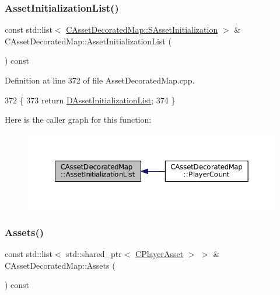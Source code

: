 \subsubsection{\texorpdfstring{Asset\+Initialization\+List()}{AssetInitializationList()}}
{\footnotesize\ttfamily const std\+::list$<$ \hyperlink{structCAssetDecoratedMap_1_1SAssetInitialization}{C\+Asset\+Decorated\+Map\+::\+S\+Asset\+Initialization} $>$ \& C\+Asset\+Decorated\+Map\+::\+Asset\+Initialization\+List (\begin{DoxyParamCaption}{ }\end{DoxyParamCaption}) const}



Definition at line 372 of file Asset\+Decorated\+Map.\+cpp.


\begin{DoxyCode}
372                                                                                                           \{
373     \textcolor{keywordflow}{return} \hyperlink{classCAssetDecoratedMap_a2b7bf2e9a19a9173093cef32048608c2}{DAssetInitializationList};
374 \}
\end{DoxyCode}
Here is the caller graph for this function\+:\nopagebreak
\begin{figure}[H]
\begin{center}
\leavevmode
\includegraphics[width=350pt]{classCAssetDecoratedMap_aa71f42e162c1d3003248306bfa15e69d_icgraph}
\end{center}
\end{figure}
\hypertarget{classCAssetDecoratedMap_a2f4d2597697593197567877900d55c52}{}\label{classCAssetDecoratedMap_a2f4d2597697593197567877900d55c52} 
\subsubsection{\texorpdfstring{Assets()}{Assets()}}
{\footnotesize\ttfamily const std\+::list$<$ std\+::shared\+\_\+ptr$<$ \hyperlink{classCPlayerAsset}{C\+Player\+Asset} $>$ $>$ \& C\+Asset\+Decorated\+Map\+::\+Assets (\begin{DoxyParamCaption}{ }\end{DoxyParamCaption}) const}



